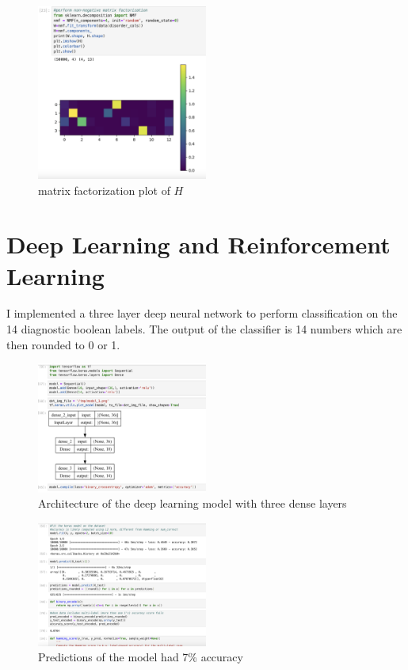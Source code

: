 \documentclass[11pt]{amsart}
\begin{document}
\begin{figure}[h]
\caption{matrix factorization plot of $H$}
\centering
\includegraphics[width=0.5\textwidth]{matrix_factorization.png}
\end{figure}

\section{Deep Learning and Reinforcement Learning}

I implemented a three layer deep neural network to perform classification on the 14 diagnostic boolean labels. The output of the classifier is 14 numbers which are then rounded to 0 or 1.

\begin{figure}[h]
\caption{Architecture of the deep learning model with three dense layers}
\centering
\includegraphics[width=0.5\textwidth]{model_architecture.png}
\end{figure}

\begin{figure}[h]
\caption{Predictions of the model had 7\% accuracy}
\centering
\includegraphics[width=0.5\textwidth]{model_predictions.png}
\end{figure}
\end{document}
